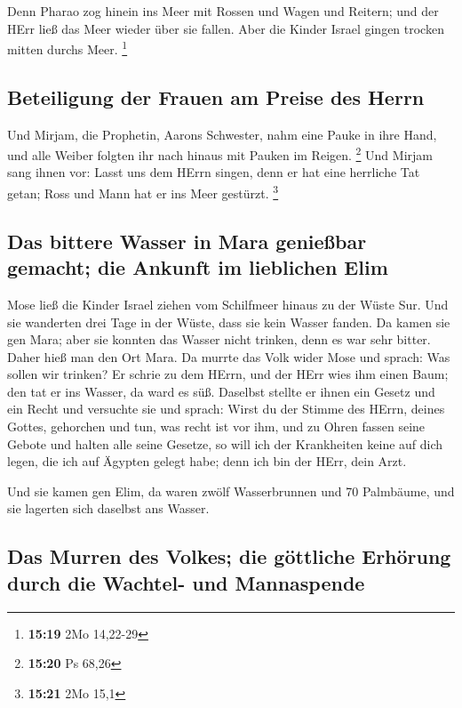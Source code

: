  Denn Pharao zog hinein ins Meer mit Rossen und Wagen und
Reitern; und der HErr ließ das Meer wieder über sie fallen. Aber die
Kinder Israel gingen trocken mitten durchs Meer. \footnote{\textbf{15:19}
  2Mo 14,22-29}

\hypertarget{beteiligung-der-frauen-am-preise-des-herrn}{%
\subsection{Beteiligung der Frauen am Preise des
Herrn}\label{beteiligung-der-frauen-am-preise-des-herrn}}

 Und Mirjam, die Prophetin, Aarons Schwester, nahm eine
Pauke in ihre Hand, und alle Weiber folgten ihr nach hinaus mit Pauken
im Reigen. \footnote{\textbf{15:20} Ps 68,26}  Und Mirjam
sang ihnen vor: Lasst uns dem HErrn singen, denn er hat eine herrliche
Tat getan; Ross und Mann hat er ins Meer gestürzt. \footnote{\textbf{15:21}
  2Mo 15,1}

\hypertarget{das-bittere-wasser-in-mara-genieuxdfbar-gemacht-die-ankunft-im-lieblichen-elim}{%
\subsection{Das bittere Wasser in Mara genießbar gemacht; die Ankunft im
lieblichen
Elim}\label{das-bittere-wasser-in-mara-genieuxdfbar-gemacht-die-ankunft-im-lieblichen-elim}}

 Mose ließ die Kinder Israel ziehen vom Schilfmeer hinaus
zu der Wüste Sur. Und sie wanderten drei Tage in der Wüste, dass sie
kein Wasser fanden.  Da kamen sie gen Mara; aber sie
konnten das Wasser nicht trinken, denn es war sehr bitter. Daher hieß
man den Ort Mara.  Da murrte das Volk wider Mose und
sprach: Was sollen wir trinken?  Er schrie zu dem HErrn,
und der HErr wies ihm einen Baum; den tat er ins Wasser, da ward es süß.
Daselbst stellte er ihnen ein Gesetz und ein Recht und versuchte sie
 und sprach: Wirst du der Stimme des HErrn, deines
Gottes, gehorchen und tun, was recht ist vor ihm, und zu Ohren fassen
seine Gebote und halten alle seine Gesetze, so will ich der Krankheiten
keine auf dich legen, die ich auf Ägypten gelegt habe; denn ich bin der
HErr, dein Arzt.

 Und sie kamen gen Elim, da waren zwölf Wasserbrunnen und
70 Palmbäume, und sie lagerten sich daselbst ans Wasser.

\hypertarget{das-murren-des-volkes-die-guxf6ttliche-erhuxf6rung-durch-die-wachtel--und-mannaspende}{%
\subsection{Das Murren des Volkes; die göttliche Erhörung durch die
Wachtel- und
Mannaspende}\label{das-murren-des-volkes-die-guxf6ttliche-erhuxf6rung-durch-die-wachtel--und-mannaspende}}

